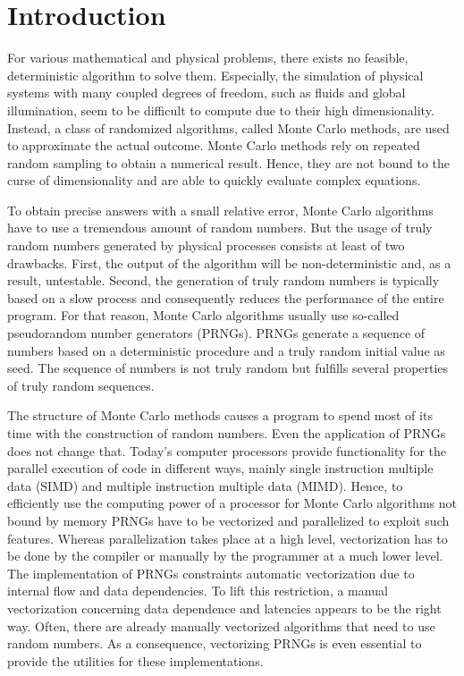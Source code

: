 \documentclass{stdlocal}
\begin{document}
\section{Introduction} %
\label{sec:introduction}

For various mathematical and physical problems, there exists no feasible, deterministic algorithm to solve them.
Especially, the simulation of physical systems with many coupled degrees of freedom, such as fluids and global illumination, seem to be difficult to compute due to their high dimensionality.
Instead, a class of randomized algorithms, called Monte Carlo methods, are used to approximate the actual outcome.
Monte Carlo methods rely on repeated random sampling to obtain a numerical result.
Hence, they are not bound to the curse of dimensionality and are able to quickly evaluate complex equations.
\autocite{pharr2016,bauke2007,mueller2012,landau2014}

To obtain precise answers with a small relative error, Monte Carlo algorithms have to use a tremendous amount of random numbers.
But the usage of truly random numbers generated by physical processes consists at least of two drawbacks.
First, the output of the algorithm will be non-deterministic and, as a result, untestable.
Second, the generation of truly random numbers is typically based on a slow process and consequently reduces the performance of the entire program.
For that reason, Monte Carlo algorithms usually use so-called pseudorandom number generators (PRNGs).
PRNGs generate a sequence of numbers based on a deterministic procedure and a truly random initial value as seed.
The sequence of numbers is not truly random but fulfills several properties of truly random sequences.
\autocite{bauke2007,intel-drng,lecuyer1994,lecuyer2015,lecuyer2017,volchan2002}

The structure of Monte Carlo methods causes a program to spend most of its time with the construction of random numbers.
Even the application of PRNGs does not change that.
Today's computer processors provide functionality for the parallel execution of code in different ways, mainly single instruction multiple data (SIMD) and multiple instruction multiple data (MIMD).
Hence, to efficiently use the computing power of a processor for Monte Carlo algorithms not bound by memory PRNGs have to be vectorized and parallelized to exploit such features.
Whereas parallelization takes place at a high level, vectorization has to be done by the compiler or manually by the programmer at a much lower level.
The implementation of PRNGs constraints automatic vectorization due to internal flow and data dependencies.
To lift this restriction, a manual vectorization concerning data dependence and latencies appears to be the right way.
Often, there are already manually vectorized algorithms that need to use random numbers.
As a consequence, vectorizing PRNGs is even essential to provide the utilities for these implementations.
\autocite{lecuyer2017,bauke2007,hennessy2019,patterson2014,barash2017,dolbeau2016,intel-optimization-reference,fog2019a,fog2019b,fog2019c,fog2019d,fog2019e}
\end{document}
